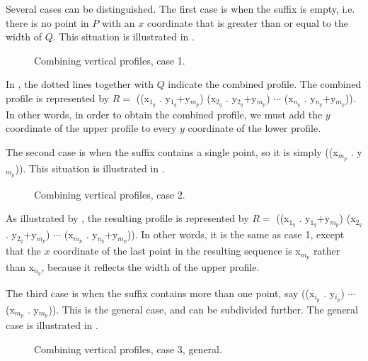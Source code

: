 Several cases can be distinguished.  The first case is when the suffix
is empty, i.e. there is no point in $P$ with an $x$ coordinate that is
greater than or equal to the width of $Q$.  This situation is
illustrated in .

\begin{figure}
\begin{center}
\end{center}
\caption{\label{fig-profile-vertical-case-1}
Combining vertical profiles, case 1.}
\end{figure}

In , the dotted lines together
with $Q$ indicate the combined profile.  The combined profile is
represented by $R = $ ((x$_{1_q}$ . y$_{1_q}$$+$y$_{m_p}$) (x$_{2_q}$
. y$_{2_q}$$+$y$_{m_p}$) $\cdots$ (x$_{n_q}$
. y$_{n_q}$$+$y$_{m_p}$)).  In other words, in order to obtain the
combined profile, we must add the $y$ coordinate of the upper profile
to every $y$ coordinate of the lower profile.

The second case is when the suffix contains a single point, so it is
simply ((x$_{m_p}$ . y$_{m_p}$)).  This situation is
illustrated in .

\begin{figure}
\begin{center}
\end{center}
\caption{\label{fig-profile-vertical-case-2}
Combining vertical profiles, case 2.}
\end{figure}

As illustrated by , the resulting
profile is represented by $R = $ ((x$_{1_q}$ . y$_{1_q}$$+$y$_{m_p}$)
(x$_{2_q}$ . y$_{2_q}$$+$y$_{m_p}$) $\cdots$ (x$_{m_p}$
. y$_{n_q}$$+$y$_{m_p}$)).  In other words, it is the same as case 1,
except that the $x$ coordinate of the last point in the resulting
sequence is x$_{m_p}$ rather than x$_{n_q}$, because it reflects the
width of the upper profile.

The third case is when the suffix contains more than one point, say
((x$_{i_p}$ . y$_{i_p}$) $\cdots$ (x$_{m_p}$ . y$_{m_p}$)).  This is
the general case, and can be subdivided further.  The general case is
illustrated in .

\begin{figure}
\begin{center}
\end{center}
\caption{\label{fig-profile-vertical-case-3}
Combining vertical profiles, case 3, general.}
\end{figure}

